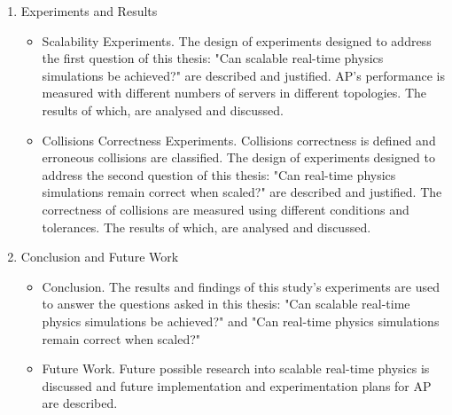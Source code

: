 \begin{enumerate}
\item Experiments and Results
\begin{itemize}
	\item Scalability Experiments. The design of experiments designed to address the first question of this thesis: "Can scalable real-time physics simulations be achieved?" are described and justified. AP's performance is measured with different numbers of servers in different topologies. The results of which, are analysed and discussed.
	\item Collisions Correctness Experiments. Collisions correctness is defined and erroneous collisions are classified. The design of experiments designed to address the second question of this thesis: "Can real-time physics simulations remain correct when scaled?" are described and justified. The correctness of collisions are measured using different conditions and tolerances. The results of which, are analysed and discussed.
\end{itemize}

\item Conclusion and Future Work
\begin{itemize}
	\item Conclusion. The results and findings of this study's experiments are used to answer the questions asked in this thesis: "Can scalable real-time physics simulations be achieved?" and "Can real-time physics simulations remain correct when scaled?"
	\item Future Work. Future possible research into scalable real-time physics is discussed and future implementation and experimentation plans for AP are described.
\end{itemize}
\end{enumerate}
